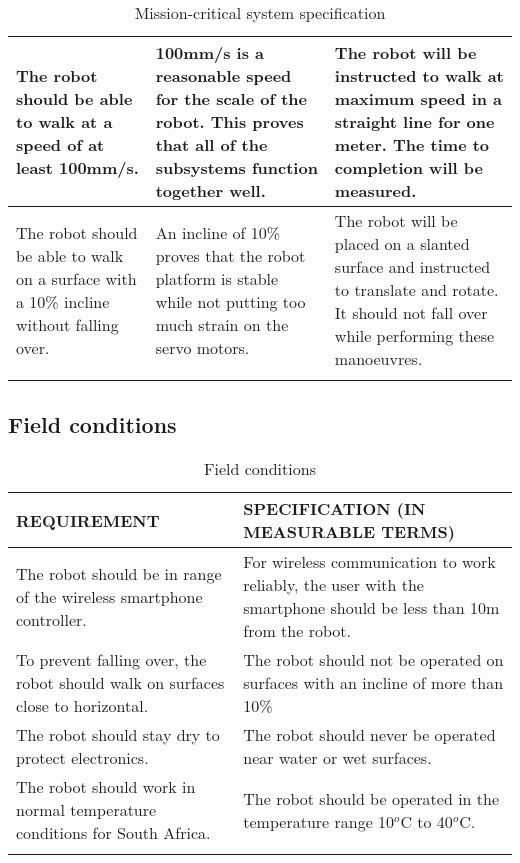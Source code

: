 \begin{center}
\begin{longtable}{|p{5cm}|p{5cm}|p{5cm}|}
   \\
\hline The robot should be able to walk at a speed of at least 100mm/s.
&100mm/s is a reasonable speed for the scale of the robot. This proves that all of the subsystems function together well.
&The robot will be instructed to walk at maximum speed in a straight line for one meter. The time to completion will be measured.\\
\hline The robot should be able to walk on a surface with a 10\% incline without falling over.
& An incline of 10\% proves that the robot platform is stable while not putting too much strain on the servo motors.
& The robot will be placed on a slanted surface and instructed to translate and rotate. It should not fall over while performing these manoeuvres.\\
\hline

\caption{Mission-critical system specification}
\end{longtable}
\end{center}

\vspace{1cm}
\subsection*{Field conditions}

\begin{center}
\begin{longtable}{|p{7.5cm}|p{7.5cm}|}
\hline
  \textbf{REQUIREMENT} &
  \textbf{SPECIFICATION (IN MEASURABLE TERMS)} \\
\hline The robot should be in range of the wireless smartphone controller.
   & For wireless communication to work reliably, the user with the smartphone should be less than 10m from the robot.
   \\
\hline To prevent falling over, the robot should walk on surfaces close to horizontal.
   & The robot should not be operated on surfaces with an incline of more than 10\%
   \\
\hline The robot should stay dry to protect electronics.
   & The robot should never be operated near water or wet surfaces.
   \\
\hline The robot should work in normal temperature conditions for South Africa.
& The robot should be operated in the temperature range 10$^o$C to 40$^o$C.
\\
\hline
\caption{Field conditions}
\end{longtable}
\end{center}

